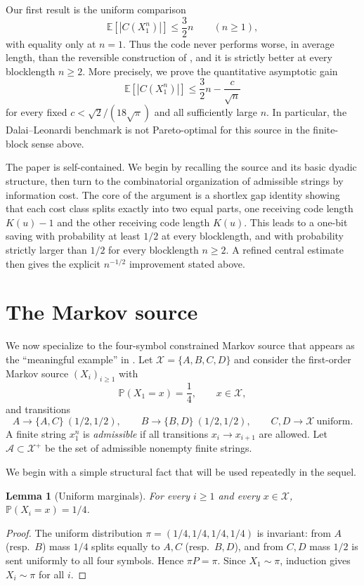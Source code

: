 \documentclass[10pt,a4paper]{article}
\newtheorem{lemma}{Lemma}
\theoremstyle{definition}
\theoremstyle{remark}
\newcommand{\1}{\mathbf{1}}
\newcommand{\PP}{\mathbb{P}}
\newcommand{\EE}{\mathbb{E}}
\begin{document}
Our first result is the uniform comparison
\[
\EE[|C(X_1^n)|]\le \frac32 n\qquad (n\ge1),
\]
with equality only at $n=1$. Thus the code never performs worse, in average length, than the reversible construction of \cite{DalaiLeonardi}, and it is strictly better at every blocklength $n\ge2$. More precisely, we prove the quantitative asymptotic gain
\[
\EE[|C(X_1^n)|]\le \frac32 n-\frac{c}{\sqrt n}
\]
for every fixed $c<\sqrt2/(18\sqrt\pi)$ and all sufficiently large $n$. In particular, the Dalai--Leonardi benchmark is not Pareto-optimal for this source in the finite-block sense above.

The paper is self-contained. We begin by recalling the source and its basic dyadic structure, then turn to the combinatorial organization of admissible strings by information cost. The core of the argument is a shortlex gap identity showing that each cost class splits exactly into two equal parts, one receiving code length $K(u)-1$ and the other receiving code length $K(u)$. This leads to a one-bit saving with probability at least $1/2$ at every blocklength, and with probability strictly larger than $1/2$ for every blocklength $n\ge2$. A refined central estimate then gives the explicit $n^{-1/2}$ improvement stated above.

\section{The Markov source}
We now specialize to the four-symbol constrained Markov source that appears as the ``meaningful example'' in \cite[Sec.~II]{DalaiLeonardi}. Let $\mathcal X=\{A,B,C,D\}$ and consider the first-order Markov source $(X_i)_{i\ge 1}$ with
\[
\PP(X_1=x)=\frac14,\qquad x\in\mathcal X,
\]
and transitions
\[
A\to\{A,C\}\ (1/2,1/2),\qquad
B\to\{B,D\}\ (1/2,1/2),\qquad
C,D\to\mathcal X\ \text{uniform}.
\]
A finite string $x_1^n$ is \emph{admissible} if all transitions $x_i\to x_{i+1}$ are allowed. Let $\mathcal A\subset\mathcal X^+$
be the set of admissible nonempty finite strings.

We begin with a simple structural fact that will be used repeatedly in the sequel.

\begin{lemma}[Uniform marginals]
For every $i\ge 1$ and every $x\in\mathcal X$, $\PP(X_i=x)=1/4$.
\end{lemma}
\begin{proof}
The uniform distribution $\pi=(1/4,1/4,1/4,1/4)$ is invariant: from $A$ (resp.\ $B$) mass $1/4$ splits equally to $A,C$ (resp.\ $B,D$),
and from $C,D$ mass $1/2$ is sent uniformly to all four symbols. Hence $\pi P=\pi$. Since $X_1\sim \pi$, induction gives $X_i\sim \pi$ for all $i$.
\end{proof}
\end{document}
